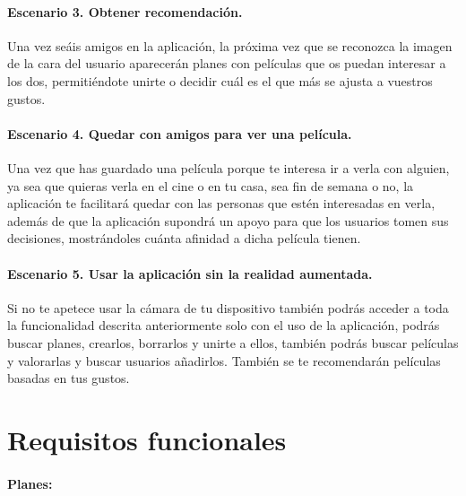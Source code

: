 \paragraph{Escenario 3. Obtener recomendación.}
    Una vez seáis amigos en la aplicación,
    la próxima vez que se reconozca la imagen de la cara del usuario aparecerán planes con películas que os puedan interesar a los dos, permitiéndote unirte o decidir cuál es el
    que más se ajusta a vuestros gustos. 



\paragraph{Escenario 4. Quedar con amigos para ver una película.}
    Una vez que has guardado una película porque te interesa ir a verla con alguien, ya sea que quieras verla en el cine o en tu casa, sea fin de semana o no, la aplicación te facilitará quedar 
    con las personas que estén interesadas en verla, además de que la aplicación supondrá un apoyo para que los usuarios tomen sus decisiones, mostrándoles cuánta afinidad a dicha película tienen.

\paragraph{Escenario 5. Usar la aplicación sin la realidad aumentada.}
     Si no te apetece usar la cámara de tu dispositivo también podrás acceder a toda la funcionalidad descrita anteriormente solo con el uso de la aplicación, podrás buscar planes, crearlos, borrarlos y unirte a ellos, también podrás buscar películas y valorarlas y buscar usuarios añadirlos. También se te 
     recomendarán películas basadas en tus gustos.

\section{Requisitos funcionales}
\label{makereference3.3}

\paragraph{\large Planes:\\}

